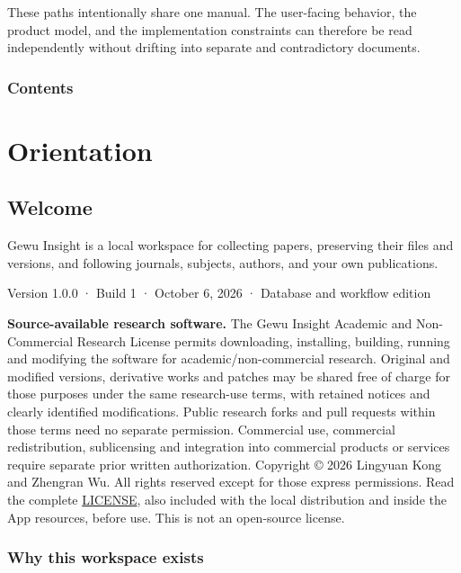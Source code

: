 \documentclass[10pt,letterpaper,oneside]{scrreprt}
\newenvironment{GewuLead}
  {\begin{list}{}{\leftmargin=0pt\rightmargin=0pt\topsep=0pt\partopsep=0pt\parsep=0pt}\item\relax
    \sffamily\fontsize{10.5}{13.2}\selectfont\color{GewuMuted}}
  {\end{list}}
\begin{document}
These paths intentionally share one manual. The user-facing behavior, the product model, and the implementation constraints can therefore be read independently without drifting into separate and contradictory documents.

\clearpage
\section*{Contents}
\begingroup
{}
\setlength{\parskip}{0pt}
\makeatletter
{}
\makeatother
\endgroup
\clearpage
\RaggedRight
\part{Orientation}\label{part-1}

\chapter{Welcome}\label{welcome}

\begin{GewuLead}
Gewu Insight is a local workspace for collecting papers, preserving their files and versions, and following journals, subjects, authors, and your own publications.
\end{GewuLead}

Version 1.0.0 · Build 1 · October 6, 2026 · Database and workflow edition

\textbf{Source-available research software.} The Gewu Insight Academic and Non-Commercial Research License permits downloading, installing, building, running and modifying the software for academic/non-commercial research. Original and modified versions, derivative works and patches may be shared free of charge for those purposes under the same research-use terms, with retained notices and clearly identified modifications. Public research forks and pull requests within those terms need no separate permission. Commercial use, commercial redistribution, sublicensing and integration into commercial products or services require separate prior written authorization. Copyright © 2026 Lingyuan Kong and Zhengran Wu. All rights reserved except for those express permissions. Read the complete \href{https://github.com/LKong92/Gewu-Insight/blob/main/LICENSE}{LICENSE}, also included with the local distribution and inside the App resources, before use. This is not an open-source license.

\section{Why this workspace exists}\label{why-this-workspace-exists}
\end{document}
